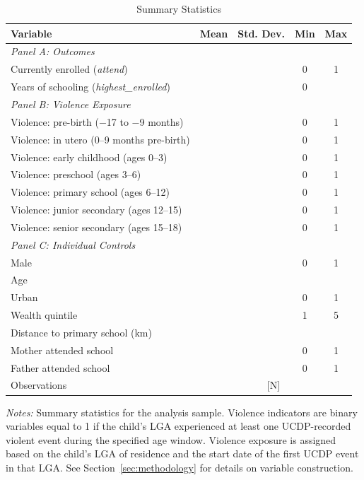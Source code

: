 \begin{table}[H]
    \centering
    \caption{Summary Statistics}
    \label{tab:summary_stats}
    \begin{threeparttable}
        \begin{tabular}{lcccc}
            \toprule
            Variable & Mean & Std. Dev. & Min & Max \\
            \midrule
            \multicolumn{5}{l}{\textit{Panel A: Outcomes}} \\[0.3em]
            Currently enrolled (\textit{attend}) & & & 0 & 1 \\
            Years of schooling (\textit{highest\_enrolled}) & & & 0 & \\[0.5em]
            \multicolumn{5}{l}{\textit{Panel B: Violence Exposure}} \\[0.3em]
            Violence: pre-birth ($-$17 to $-$9 months) & & & 0 & 1 \\
            Violence: in utero (0–9 months pre-birth) & & & 0 & 1 \\
            Violence: early childhood (ages 0–3) & & & 0 & 1 \\
            Violence: preschool (ages 3–6) & & & 0 & 1 \\
            Violence: primary school (ages 6–12) & & & 0 & 1 \\
            Violence: junior secondary (ages 12–15) & & & 0 & 1 \\
            Violence: senior secondary (ages 15–18) & & & 0 & 1 \\[0.5em]
            \multicolumn{5}{l}{\textit{Panel C: Individual Controls}} \\[0.3em]
            Male & & & 0 & 1 \\
            Age & & & & \\
            Urban & & & 0 & 1 \\
            Wealth quintile & & & 1 & 5 \\
            Distance to primary school (km) & & & & \\
            Mother attended school & & & 0 & 1 \\
            Father attended school & & & 0 & 1 \\
            \midrule
            Observations & \multicolumn{4}{c}{[N]} \\
            \bottomrule
        \end{tabular}
        \begin{tablenotes}
            \small
            \item \textit{Notes:} Summary statistics for the analysis
            sample. Violence indicators are binary variables equal to 1 if
            the child's LGA experienced at least one UCDP-recorded violent
            event during the specified age window.
            Violence exposure is assigned based on the child's LGA of
            residence and the start date of the first UCDP event in that
            LGA. See Section~\ref{sec:methodology} for details on variable
            construction.
        \end{tablenotes}
    \end{threeparttable}
\end{table}
